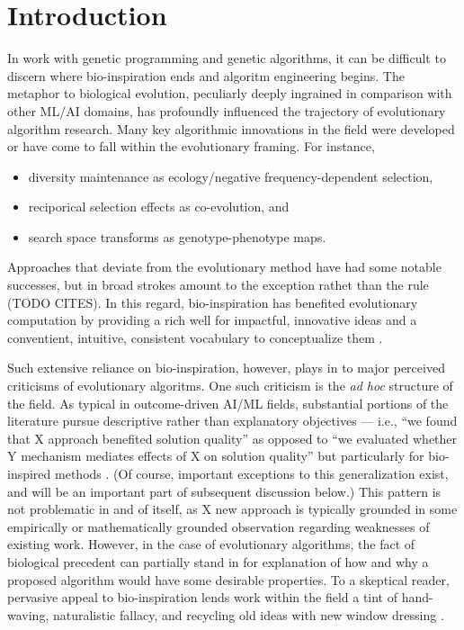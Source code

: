 \section{Introduction} \label{sec:introduction}

In work with genetic programming and genetic algorithms, it can be difficult to discern where bio-inspiration ends and algoritm engineering begins.
The metaphor to biological evolution, peculiarly deeply ingrained in comparison with other ML/AI domains, has profoundly influenced the trajectory of evolutionary algorithm research.
Many key algorithmic innovations in the field were developed or have come to fall within the evolutionary framing.
For instance,
\begin{itemize}
  \item diversity maintenance as ecology/negative frequency-dependent selection,
  \item reciporical selection effects as co-evolution, and
  \item search space transforms as genotype-phenotype maps.
\end{itemize}
Approaches that deviate from the evolutionary method have had some notable successes, but in broad strokes amount to the exception rathet than the rule (TODO CITES).
In this regard, bio-inspiration has benefited evolutionary computation by providing a rich well for impactful, innovative ideas and a conventient, intuitive, consistent vocabulary to conceptualize them \citep{sorensen2015metaheuristics,banzhaf2006artificial}.

Such extensive reliance on bio-inspiration, however, plays in to major perceived criticisms of evolutionary algoritms.
One such criticism is the \textit{ad hoc} structure of the field.
As typical in outcome-driven AI/ML fields, substantial portions of the literature pursue descriptive rather than explanatory objectives --- i.e., ``we found that X approach benefited solution quality'' as opposed to ``we evaluated whether Y mechanism mediates effects of X on solution quality'' \citep{lipton2019troubling,hutson2018ai,sculley2018winner} but particularly for bio-inspired methods \citep{del2019bio}.
(Of course, important exceptions to this generalization exist, and will be an important part of subsequent discussion below.)
This pattern is not problematic in and of itself, as X new approach is typically grounded in some empirically or mathematically grounded observation regarding weaknesses of existing work.
However, in the case of evolutionary algorithms, the fact of biological precedent can partially stand in for explanation of how and why a proposed algorithm would have some desirable properties.
To a skeptical reader, pervasive appeal to bio-inspiration lends work within the field a tint of hand-waving, naturalistic fallacy, and recycling old ideas with new window dressing \citep{wortmann2020does,sorensen2015metaheuristics}.

